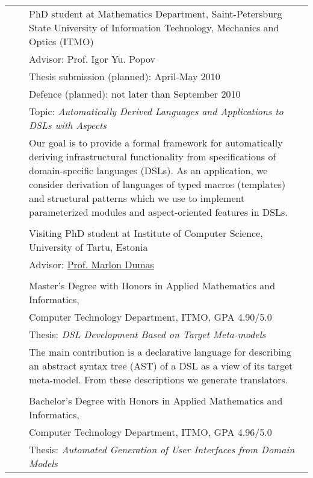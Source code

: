 \documentclass[a4paper, 12pt]{article}
\begin{document}
\begin{tabular*}{1.0\textwidth}[t]{p{70pt} l p{370pt}}
	\raggedleft{since 2007}&\hspace{10pt}&PhD student at Mathematics Department, Saint-Petersburg State University of Information Technology, Mechanics and Optics (ITMO)\\
	&&Advisor: Prof. Igor Yu. Popov \\
	&&Thesis submission (planned): April-May 2010\\
	&&Defence (planned): not later than September 2010\\
	&&Topic: \textit{Automatically Derived Languages and Applications to DSLs with Aspects}\\
	&&Our goal is to provide a formal framework for automatically deriving infrastructural functionality 
	  from specifications of domain-specific languages (DSLs).
	  As an application, we consider derivation of languages of typed macros (templates) and structural patterns
	  which we use to implement parameterized modules and aspect-oriented features in DSLs. \\
	&&\\
	\raggedleft{2009 -- 2010}&& Visiting PhD student at Institute of Computer Science, University of Tartu, Estonia\\
	&&Advisor: \href{http://math.ut.ee/~dumas/}{Prof. Marlon Dumas} \\
	&&\\
	\raggedleft{2007} && Master's Degree with Honors in Applied Mathematics and Informatics, \\
	&&Computer Technology Department, ITMO, GPA 4.90/5.0\\
	&&Thesis: \textit{DSL Development Based on Target Meta-models}\\
	&&The main contribution is a declarative language for describing an abstract syntax tree (AST) of a 
	  DSL as a view of its target meta-model. From these descriptions we generate translators. \\
	&&\\
	\raggedleft{2005} && Bachelor's Degree with Honors in Applied Mathematics and Informatics, \\
	&&Computer Technology Department, ITMO, GPA 4.96/5.0\\
	&&Thesis: \textit{Automated Generation of User Interfaces from Domain Models}\\
\end{tabular*}
\end{document}
